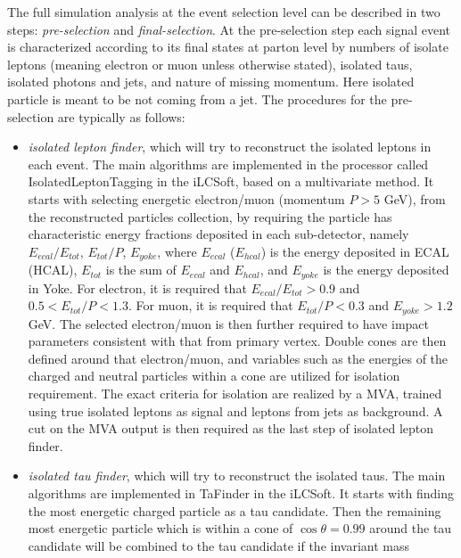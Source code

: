The full simulation analysis at the event selection level can be described 
in two steps: {\it pre-selection} and {\it final-selection}. At the pre-selection step
each signal event is characterized according to its final states at parton level by
numbers of isolate leptons (meaning electron or muon unless otherwise stated), 
isolated taus, isolated photons and jets, and nature of missing momentum.
Here isolated particle is meant to be not coming from a jet. The procedures
for the pre-selection are typically as follows:
\begin{itemize}
\item {\it isolated lepton finder}, which will try to reconstruct the isolated leptons
in each event. The main algorithms are implemented in the processor called
IsolatedLeptonTagging in the iLCSoft, based on a multivariate method.
It starts with selecting energetic electron/muon (momentum $P>5$ GeV), 
from the reconstructed particles collection, by requiring the particle has characteristic
energy fractions deposited in each sub-detector, namely $E_{ecal}/E_{tot}$,
$E_{tot}/P$, $E_{yoke}$, where $E_{ecal}$ ($E_{hcal}$) is the energy deposited 
in ECAL (HCAL), $E_{tot}$ is the sum of $E_{ecal}$ and $E_{hcal}$, and
$E_{yoke}$ is the energy deposited in Yoke. For electron, 
it is required that $E_{ecal}/E_{tot}>0.9$ and $0.5<E_{tot}/P<1.3$. For muon,
it is required that $E_{tot}/P<0.3$ and $E_{yoke}>1.2$ GeV. The selected
electron/muon is then further required to have impact parameters consistent with
that from primary vertex. Double cones are then defined around that electron/muon,
and variables such as the energies of the charged and neutral particles within a cone 
are utilized for isolation requirement. The exact criteria for isolation 
are realized by a MVA, trained using true isolated leptons as signal 
and leptons from jets as background.
A cut on the MVA output is then required as the last step of isolated lepton finder.
\item {\it isolated tau finder}, which will try to reconstruct the isolated taus. 
The main algorithms are implemented in TaFinder in the iLCSoft. It starts
with finding the most energetic charged particle as a tau candidate. Then the
remaining most energetic particle which is within a cone of $\cos\theta=0.99$ around
the tau candidate will be combined to the tau candidate if the invariant mass

\end{itemize}
